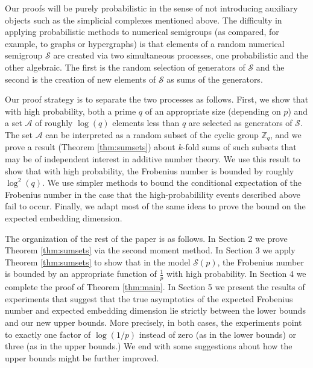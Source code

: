 \documentclass[11pt]{amsart}
\theoremstyle{definition}
\theoremstyle{remark}
\def\ZZ{\ensuremath{\mathbb{Z}}}
\def\cA{\ensuremath{\mathcal{A}}}
\def\nsg{\ensuremath{\mathcal{S}}}
\begin{document}
Our proofs will be purely probabilistic in the sense of not introducing auxiliary objects such as the simplicial complexes mentioned above. The difficulty in applying probabilistic methods to numerical semigroups (as compared, for example, to graphs or hypergraphs) is that elements of a random numerical semigroup $\nsg$ are created via two simultaneous processes, one probabilistic and the other algebraic. The first is the random selection of generators of $\nsg$ and the second is the creation of new elements of $\nsg$ as sums of the generators. 

Our proof strategy is to separate the two processes as follows. First, we show that with high probability, both a prime $q$ of an appropriate size (depending on $p$) and a set $\cA$ of roughly $\log(q)$ elements less than $q$ are selected as generators of $\nsg$. The set $\cA$ can be interpreted as a random subset of the cyclic group $\ZZ_q$, and we prove a result (Theorem \ref{thm:sumsets}) about $k$-fold sums of such subsets that may be of independent interest in additive number theory. We use this result to show that with high probability, the Frobenius number is bounded by roughly $\log^2(q)$.  We use simpler methods to bound the conditional expectation of the Frobenius number in the case that the high-probabilility events described above fail to occur. Finally, we adapt most of the same ideas to prove the bound on the expected embedding dimension.

  
The organization of the rest of the paper is as follows. In Section 2 we prove Theorem \ref{thm:sumsets} via the second moment method. In Section 3 we apply Theorem \ref{thm:sumsets} to show that in the model $\nsg(p)$, the Frobenius number is bounded by an appropriate function of $\frac{1}{p}$ with high probability. In Section 4 we complete the proof of Theorem \ref{thm:main}. In Section 5 we present the results of experiments that suggest that the true asymptotics of the expected Frobenius number and expected embedding dimension lie strictly between the lower bounds and our new upper bounds. More precisely, in both cases, the experiments point to exactly one factor of $\log(1/p)$ instead of zero (as in the lower bounds) or three (as in the upper bounds.) We end with some suggestions about how the upper bounds might be further improved.
\end{document}
